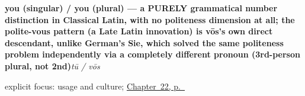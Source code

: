 \noindent\begin{minipage}[t]{\linewidth}
\raggedright
\textbf{you (singular) / you (plural) — a PURELY grammatical number distinction in Classical Latin, with no politeness dimension at all; the polite-vous pattern (a Late Latin innovation) is vōs's own direct descendant, unlike German's Sie, which solved the same politeness problem independently via a completely different pronoun (3rd-person plural, not 2nd)}\enspace\emph{tū / vōs}\par
\footnotesize explicit focus: usage and culture; \hyperref[ch:la-you-singular-plural]{Chapter~22, p.~\pageref*{ch:la-you-singular-plural}}
\end{minipage}\par\smallskip
